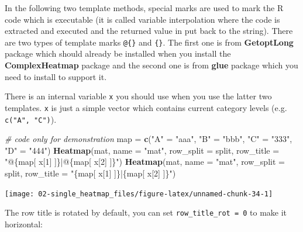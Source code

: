 \documentclass[]{book}
\newenvironment{Shaded}{\begin{snugshade}}{\end{snugshade}}
\newcommand{\KeywordTok}[1]{\textcolor[rgb]{0.13,0.29,0.53}{\textbf{#1}}}
\newcommand{\DataTypeTok}[1]{\textcolor[rgb]{0.13,0.29,0.53}{#1}}
\newcommand{\DecValTok}[1]{\textcolor[rgb]{0.00,0.00,0.81}{#1}}
\newcommand{\StringTok}[1]{\textcolor[rgb]{0.31,0.60,0.02}{#1}}
\newcommand{\CommentTok}[1]{\textcolor[rgb]{0.56,0.35,0.01}{\textit{#1}}}
\newcommand{\NormalTok}[1]{#1}
\theoremstyle{definition}
\theoremstyle{definition}
\theoremstyle{definition}
\theoremstyle{remark}
\begin{document}
In the following two template methods, special marks are used to mark
the R code which is executable (it is called variable interpolation
where the code is extracted and executed and the returned value in put
back to the string). There are two types of template marks
\texttt{@\{\}} and \texttt{\{\}}. The first one is from
\textbf{GetoptLong} package which should already be installed when you
install the \textbf{ComplexHeatmap} package and the second one is from
\textbf{glue} package which you need to install to support it.

There is an internal variable \texttt{x} you should use when you use the
latter two templates. \texttt{x} is just a simple vector which contains
current category levels (e.g. \texttt{c("A",\ "C")}).

\begin{Shaded}
\begin{Highlighting}[]
\CommentTok{# code only for demonstration}
\NormalTok{map =}\StringTok{ }\KeywordTok{c}\NormalTok{(}\StringTok{"A"}\NormalTok{ =}\StringTok{ "aaa"}\NormalTok{, }\StringTok{"B"}\NormalTok{ =}\StringTok{ "bbb"}\NormalTok{, }\StringTok{"C"}\NormalTok{ =}\StringTok{ "333"}\NormalTok{, }\StringTok{"D"}\NormalTok{ =}\StringTok{ "444"}\NormalTok{)}
\KeywordTok{Heatmap}\NormalTok{(mat, }\DataTypeTok{name =} \StringTok{"mat"}\NormalTok{, }\DataTypeTok{row_split =}\NormalTok{ split, }\DataTypeTok{row_title =} \StringTok{"@\{map[ x[1] ]\}|@\{map[ x[2] ]\}"}\NormalTok{)}
\KeywordTok{Heatmap}\NormalTok{(mat, }\DataTypeTok{name =} \StringTok{"mat"}\NormalTok{, }\DataTypeTok{row_split =}\NormalTok{ split, }\DataTypeTok{row_title =} \StringTok{"\{map[ x[1] ]\}|\{map[ x[2] ]\}"}\NormalTok{)}
\end{Highlighting}
\end{Shaded}

\begin{center}\texttt{[image: 02-single\_heatmap\_files/figure-latex/unnamed-chunk-34-1]} \end{center}

The row title is rotated by default, you can set
\texttt{row\_title\_rot\ =\ 0} to make it horizontal:

\begin{Shaded}
\end{Shaded}
\end{document}
